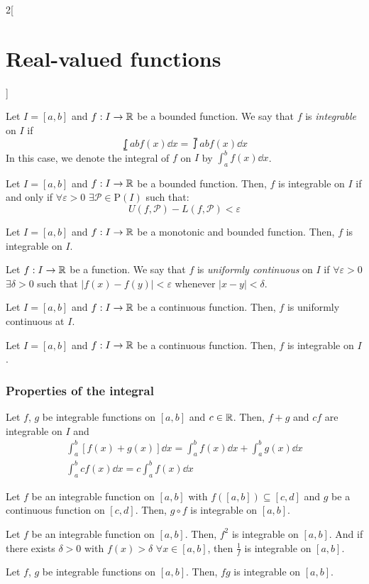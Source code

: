 \documentclass[../../../main_math.tex]{subfiles}
\begin{document}
\begin{multicols}{2}[\section{Real-valued functions}]
\begin{definition}
  \end{definition}
  \begin{definition}\label{RVF:integrable}
    Let $I=[a,b]$ and $f:I\rightarrow\mathbb{R}$ be a bounded function. We say that $f$ is \emph{integrable} on $I$ if $$\lowint{a}{b}f(x)\dd{x}=\upint{a}{b}f(x)\dd{x}$$ In this case, we denote the integral of $f$ on $I$ by $\displaystyle\int_a^b f(x)\dd{x}$.
  \end{definition}
  \begin{lemma}
    Let $I=[a,b]$ and $f:I\rightarrow\mathbb{R}$ be a bounded function. Then, $f$ is integrable on $I$ if and only if $\forall\varepsilon>0$ $\exists\mathcal{P}\in\mathrm{P}(I)$ such that: $$U(f,\mathcal{P})-L(f,\mathcal{P})<\varepsilon$$
  \end{lemma}
  \begin{theorem}
    Let $I=[a,b]$ and $f:I\rightarrow\mathbb{R}$ be a monotonic and bounded function. Then, $f$ is integrable on $I$.
  \end{theorem}
  \begin{definition}
    Let $f:I\rightarrow\mathbb{R}$ be a function. We say that $f$ is \emph{uniformly continuous} on $I$ if $\forall\varepsilon>0$ $\exists\delta>0$ such that $|f(x)-f(y)|<\varepsilon$ whenever $|x-y|<\delta$.
  \end{definition}
  \begin{theorem}
    Let $I=[a,b]$ and $f:I\rightarrow\mathbb{R}$ be a continuous function. Then, $f$ is uniformly continuous at $I$.
  \end{theorem}
  \begin{theorem}
    Let $I=[a,b]$ and $f:I\rightarrow\mathbb{R}$ be a continuous function. Then, $f$ is integrable on $I$.
  \end{theorem}
  \subsubsection{Properties of the integral}
  \begin{proposition}
    Let $f$, $g$ be integrable functions on $[a,b]$ and $c\in\mathbb{R}$. Then, $f+g$ and $cf$ are integrable on $I$ and
    \begin{gather*}
      \int_a^b[f(x)+g(x)]\dd{x}=\int_a^bf(x)\dd{x}+\int_a^bg(x)\dd{x}\\ \int_a^b cf(x)\dd{x}=c\int_a^bf(x)\dd{x}
    \end{gather*}
  \end{proposition}
  \begin{theorem}
    Let $f$ be an integrable function on $[a,b]$ with $f([a,b])\subseteq[c,d]$ and $g$ be a continuous function on $[c,d]$. Then, $g\circ f$ is integrable on $[a,b]$.
  \end{theorem}
  \begin{corollary}
    Let $f$ be an integrable function on $[a,b]$. Then, $f^2$ is integrable on $[a,b]$. And if there exists $\delta>0$ with $f(x)>\delta$ $\forall x\in [a,b]$, then $\frac{1}{f}$ is integrable on $[a,b]$.
  \end{corollary}
  \begin{corollary}
    Let $f$, $g$ be integrable functions on $[a,b]$. Then, $fg$ is integrable on $[a,b]$.
  \end{corollary}

\end{multicols}
\end{document}
